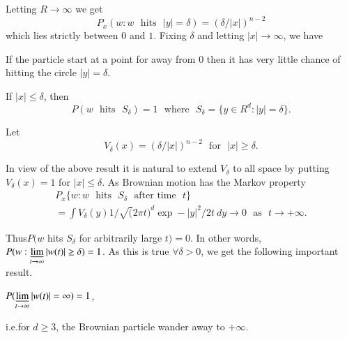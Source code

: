 Letting $R\to \infty$ we get
$$
P_{x}(w:w\text{~ hits~ }|y|=\delta)=(\delta/|x|)^{n-2}
$$
which lies strictly between $0$ and $1$. Fixing $\delta$ and letting
$|x|\to\infty$, we have

\begin{prop*}
If the particle start at a point for away from $0$ then it has very
little chance of hitting the circle $|y|=\delta$.

If $|x|\leq \delta$, then
$$
P(w\text{~ hits~ } S_{\delta})=1\text{~ where~ }S_{\delta}=\{y\in
R^{d}:|y|=\delta\}.
$$

Let
$$
V_{\delta}(x)=(\delta/|x|)^{n-2}\text{~ for~ } |x|\geq \delta.
$$

In view of the above result it is natural to extend $V_{\delta}$ to
all space by putting $V_{\delta}(x)=1$ for $|x|\leq \delta$. As
Brownian motion has the Markov property
\begin{gather*}
P_{x}\{w:w\text{~ hits~ }S_{\delta}\text{~ after time~ }t\}\\
=\int V_{\delta}(y)1/\surd(2\pi t)^{d}\exp -|y|^{2}/2t\ dy\to 0\text{~
  as~ }t\to +\infty.
\end{gather*}
\end{prop*}

Thus\pageoriginale $P(w$ hits $S_{\delta}$ for arbitrarily large
$t)=0$. In other words, $P(w:\varliminf\limits_{t\to \infty}|w(t)|\geq
\delta)=1$. As this is true $\forall \delta>0$, we get the following
important result.

\begin{prop*}
$P(\varliminf\limits_{t\to \infty}|w(t)|=\infty)=1$,

i.e.\@ for $d\geq 3$, the Brownian particle wander away to $+\infty$.
\end{prop*}


